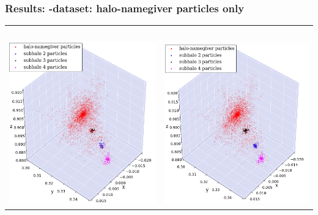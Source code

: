 \begin{frame}
	\frametitle{Results: \cosmo-dataset: halo-namegiver particles only}
	
	\begin{tabular}{c c}
		\neigh\ 	& \iter \\[1.5em]
		{\includegraphics[width = .49\textwidth]{../report/images/cosmo/cos-halo-66858-saddle.png}}	& 
		{\includegraphics[width = .49\textwidth]{../report/images/cosmo/cos-halo-66858-iter.png}}
	\end{tabular}
\end{frame}



